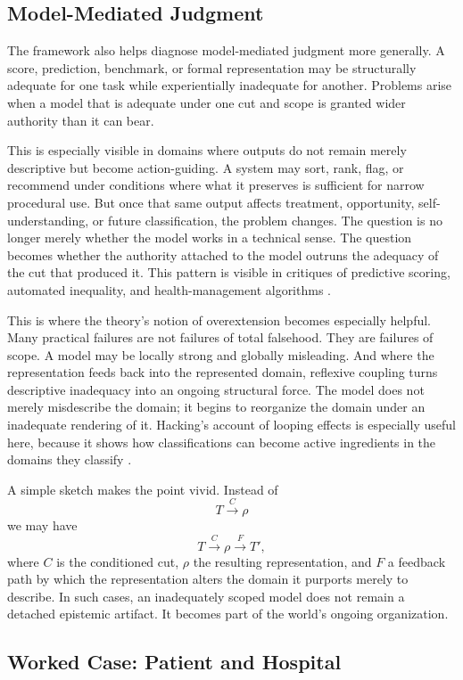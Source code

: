 \documentclass[11pt]{article}
\begin{document}
\subsection{Model-Mediated Judgment}

The framework also helps diagnose model-mediated judgment more generally. A score, prediction, benchmark, or formal representation may be structurally adequate for one task while experientially inadequate for another. Problems arise when a model that is adequate under one cut and scope is granted wider authority than it can bear.

This is especially visible in domains where outputs do not remain merely descriptive but become action-guiding. A system may sort, rank, flag, or recommend under conditions where what it preserves is sufficient for narrow procedural use. But once that same output affects treatment, opportunity, self-understanding, or future classification, the problem changes. The question is no longer merely whether the model works in a technical sense. The question becomes whether the authority attached to the model outruns the adequacy of the cut that produced it. This pattern is visible in critiques of predictive scoring, automated inequality, and health-management algorithms \cite{ONeil2016,Eubanks2018,ObermeyerEtAl2019}.

This is where the theory's notion of overextension becomes especially helpful. Many practical failures are not failures of total falsehood. They are failures of scope. A model may be locally strong and globally misleading. And where the representation feeds back into the represented domain, reflexive coupling turns descriptive inadequacy into an ongoing structural force. The model does not merely misdescribe the domain; it begins to reorganize the domain under an inadequate rendering of it. Hacking's account of looping effects is especially useful here, because it shows how classifications can become active ingredients in the domains they classify \cite{Hacking1995}.

A simple sketch makes the point vivid. Instead of
\[
T \xrightarrow{C} \rho
\]
we may have
\[
T \xrightarrow{C} \rho \xrightarrow{F} T',
\]
where \(C\) is the conditioned cut, \(\rho\) the resulting representation, and \(F\) a feedback path by which the representation alters the domain it purports merely to describe. In such cases, an inadequately scoped model does not remain a detached epistemic artifact. It becomes part of the world's ongoing organization.

\subsection{Worked Case: Patient and Hospital}
\end{document}
